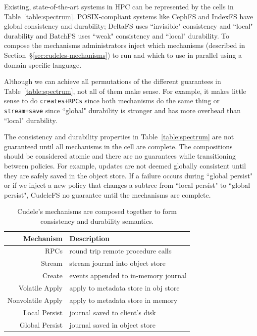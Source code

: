 Existing, state-of-the-art systems in HPC can be represented by the cells in
Table~\ref{table:spectrum}.  POSIX-compliant systems like CephFS and IndexFS
have global consistency and durability; DeltaFS uses ``invisible" consistency
and ``local" durability and BatchFS uses ``weak" consistency and ``local"
durability.  To compose the mechanisms administrators inject which mechanisms
(described in Section~\S\ref{sec:cudeles-mechanisms}) to run and which to use
in parallel using a domain specific language. 

Although we can achieve all permutations of the different guarantees in
Table~\ref{table:spectrum}, not all of them make sense. For example, it
makes little sense to do \texttt{creates+RPCs} since both mechanisms do the same
thing or \texttt{stream+save} since ``global" durability is stronger and has
more overhead than ``local" durability. 

The consistency and durability properties in Table~\ref{table:spectrum} are not
guaranteed until all mechanisms in the cell are complete. The compositions
should be considered atomic and there are no guarantees while transitioning
between policies. For example, updates are not deemed globally consistent until
they are safely saved in the object store. If a failure occurs during ``global
persist" or if we inject a new policy that changes a subtree from ``local
persist" to ``global persist", CudeleFS no guarantee until the mechanisms are
complete.

\begin{table}
\begin{tabular}{ r | l }
  Mechanism         & Description \\\hline
  RPCs              & round trip remote procedure calls \\
  Stream            & stream journal into object store \\
  Create            & events appended to in-memory journal \\
  Volatile Apply    & apply to metadata store in obj store \\
  Nonvolatile Apply & apply to metadata store in memory \\
  Local Persist     & journal saved to client's disk \\
  Global Persist    & journal saved in object store \\
\end{tabular}
\caption{Cudele's mechanisms are composed together to form consistency and
durability semantics.\label{table:mechanisms}} 
\end{table}

